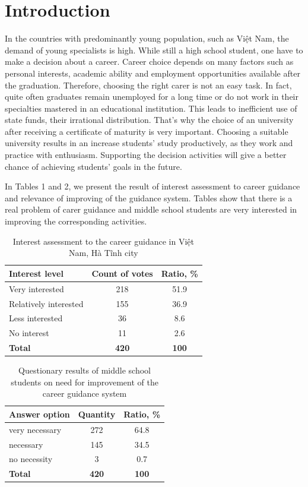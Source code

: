 \documentclass[conference,a4]{IEEEtran}
\begin{document}
\section{Introduction}

In the countries with predominantly young population, such as Việt Nam, the demand of young specialists is high.  While still a high school student, one have to make a decision about a career. Career choice depends on many factors such as personal interests, academic ability and employment opportunities available after the graduation.  Therefore, choosing the right carer is not an easy task.  In fact, quite often graduates remain unemployed for a long time or do not work in their specialties mastered in an educational institution.  This leads to inefficient use of state funds, their irrational distribution.  That's why the choice of an university after receiving a certificate of maturity is very important.  Choosing a suitable university results in an increase students' study productively, as they work and practice with enthusiasm.  Supporting the decision activities will give a better chance of achieving students' goals in the future.

In Tables 1 and 2, we present the result of interest assessment to career guidance and relevance of improving of the guidance system.  Tables show that there is a real problem of carer guidance and middle school students are very interested in improving the corresponding activities.
\begin{table}[thb]
  \caption{Interest assessment to the career guidance in Việt Nam, Hà Tĩnh city}
  \label{tab:interest}
  \centering
  \begin{tabular}{|l|c|c|}
    \hline
    \textbf{Interest level} & \textbf{Count of votes} & \textbf{Ratio, \%} \\
    \hline
    Very interested & 218 & 51.9 \\
    \hline
    Relatively interested & 155 & 36.9 \\
    \hline
    Less interested & 36 & 8.6 \\
    \hline
    No interest & 11 & 2.6 \\
    \textbf{Total} & \textbf{420} & \textbf{100} \\
    \hline
  \end{tabular}
\end{table}

\begin{table}[bht]
  \caption{Questionary results of middle school students on need for improvement of the career guidance system}
  \label{tab:interest}
  \centering
  \begin{tabular}{|l|c|c|}
    \hline
    \textbf{Answer option} & \textbf{Quantity} & \textbf{Ratio, \%} \\
    \hline
    very necessary & 272 & 64.8 \\
    \hline
    necessary & 145 & 34.5 \\
    \hline
    no necessity & 3 & 0.7 \\
    \hline
    \textbf{Total} & \textbf{420} & \textbf{100} \\
    \hline
  \end{tabular}
\end{table}
\end{document}
